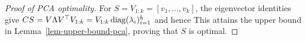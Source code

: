\begin{proof}[Proof of PCA optimality]
	For $S=V_{1:k}=[v_1,\ldots,v_k]$, the eigenvector identities give $CS = V \Lambda V^\top V_{1:k} = V_{1:k} \operatorname{diag}(\lambda_i)_{i=1}^k$ and hence
	This attains the upper bound in Lemma~\ref{lem-upper-bound-pca}, proving that $S$ is optimal.
\end{proof}


